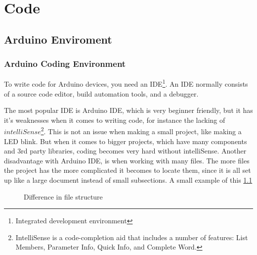 \chapter{Code}

\section{Arduino Enviroment}

\subsection{Arduino Coding Environment}
To write code for Arduino devices, you need an IDE\footnote{Integrated development environment}. An IDE normally consists of a source code editor, build automation tools, and a debugger.  

The most popular IDE is Arduino IDE, which is very beginner friendly, but it has it's weaknesses when it comes to writing code, for instance the lacking of $intelliSense$\footnote{IntelliSense is a code-completion aid that includes a number of features: List Members, Parameter Info, Quick Info, and Complete Word.}. This is not an issue when making a small project, like making a LED blink. But when it comes to bigger projects, which have many components and 3rd party libraries, coding becomes very hard without intelliSense. Another disadvantage with Arduino IDE, is when working with many files. The more files the project has the more complicated it becomes to locate them, since it is all set up like a large document instead of small subsections. A small example of this \ref{fig:example}

\newpage

\begin{figure}[!h]
    \centering
    \qquad
    \caption{Difference in file structure}%
    \label{fig:example}%
\end{figure} 
 

